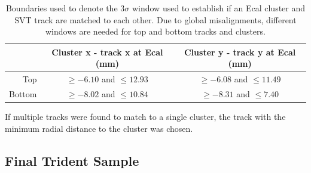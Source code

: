 \begin{table}[t]
    \begin{center}
        \begin{tabular}{r|cc}
            \hline
                    & Cluster x - track x at Ecal (mm) &  Cluster y - track y at Ecal (mm)  \\
            \hline
            Top     & $\ge -6.10$ and $\le 12.93$ & $\ge -6.08$ and $\le 11.49$ \\ 
            Bottom  & $\ge -8.02$ and $\le 10.84$ & $\ge -8.31$ and $\le 7.40$  \\ 
            \hline
        \end{tabular}
    \end{center}
    \caption{Boundaries used to denote the 3$\sigma$ window used to establish if 
             an Ecal cluster and SVT track are matched to each other.  Due to 
             global misalignments, different windows are needed for top and 
             bottom tracks and clusters.}
    \label{tab:track_cluster_cuts}
\end{table}
If multiple tracks were found to match to a single cluster, the track 
with the minimum radial distance to the cluster was chosen.  

\subsection{Final Trident Sample}

